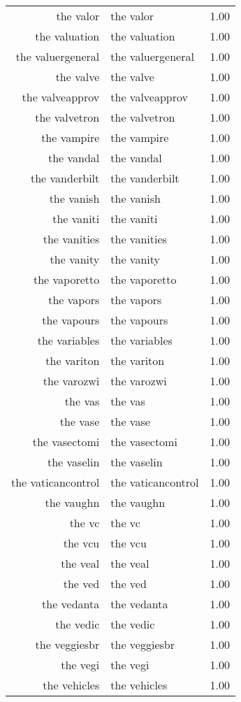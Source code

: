 \begin{table}[ht]
\begin{tabular}{rlr}
  the valor & the valor & 1.00 \\ 
  the valuation & the valuation & 1.00 \\ 
  the valuergeneral & the valuergeneral & 1.00 \\ 
  the valve & the valve & 1.00 \\ 
  the valveapprov & the valveapprov & 1.00 \\ 
  the valvetron & the valvetron & 1.00 \\ 
  the vampire & the vampire & 1.00 \\ 
  the vandal & the vandal & 1.00 \\ 
  the vanderbilt & the vanderbilt & 1.00 \\ 
  the vanish & the vanish & 1.00 \\ 
  the vaniti & the vaniti & 1.00 \\ 
  the vanities & the vanities & 1.00 \\ 
  the vanity & the vanity & 1.00 \\ 
  the vaporetto & the vaporetto & 1.00 \\ 
  the vapors & the vapors & 1.00 \\ 
  the vapours & the vapours & 1.00 \\ 
  the variables & the variables & 1.00 \\ 
  the variton & the variton & 1.00 \\ 
  the varozwi & the varozwi & 1.00 \\ 
  the vas & the vas & 1.00 \\ 
  the vase & the vase & 1.00 \\ 
  the vasectomi & the vasectomi & 1.00 \\ 
  the vaselin & the vaselin & 1.00 \\ 
  the vaticancontrol & the vaticancontrol & 1.00 \\ 
  the vaughn & the vaughn & 1.00 \\ 
  the vc & the vc & 1.00 \\ 
  the vcu & the vcu & 1.00 \\ 
  the veal & the veal & 1.00 \\ 
  the ved & the ved & 1.00 \\ 
  the vedanta & the vedanta & 1.00 \\ 
  the vedic & the vedic & 1.00 \\ 
  the veggiesbr & the veggiesbr & 1.00 \\ 
  the vegi & the vegi & 1.00 \\ 
  the vehicles & the vehicles & 1.00 \\ 

\end{tabular}
\end{table}
